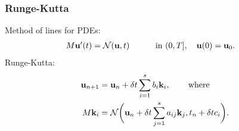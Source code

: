 \documentclass[blue]{beamer}
\begin{document}

\begin{frame}
\frametitle{Runge-Kutta}

Method of lines for PDEs:
\begin{align*}
    M\mathbf{u}'(t) & =  \mathcal{N}(\mathbf{u},t) \hspace{7.25ex}\text{in }(0,T], \quad \mathbf{u}(0) = \mathbf{u}_0.
\end{align*}
%
Runge-Kutta:
%
\begin{align*}
\mathbf{u}_{n+1} & = \mathbf{u}_n + \delta t \sum_{i=1}^s b_i\mathbf{k}_i, 
    \hspace{5ex}\textnormal{where}\\
M\mathbf{k}_i & = \mathcal{N}\bigg(\mathbf{u}_n + \delta t\sum_{j=1}^s a_{ij}\mathbf{k}_j,
    t_n+\delta tc_i\bigg).\label{eq:stages}
\end{align*}
%


\end{frame}
\end{document}
